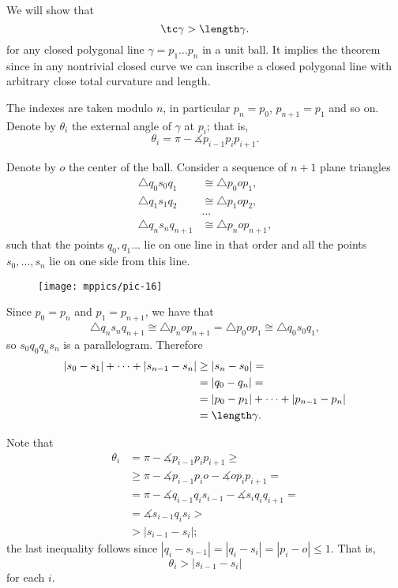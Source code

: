 We will show that 
\[\tc\gamma> \length\gamma.\]
for any closed polygonal line $\gamma=p_1\dots p_{n}$ in a unit ball.
It implies the theorem since in any nontrivial closed curve we can inscribe a closed polygonal line with arbitrary close total curvature and length.

The indexes are taken modulo $n$, in particular $p_{n}=p_0$, $p_{n+1}=p_1$ and so on.
Denote by $\theta_i$ the external angle of $\gamma$ at $p_i$;
that is,
\[\theta_i=\pi-\measuredangle p_{i-1}p_ip_{i+1}.\]

Denote by $o$ the center of the ball.
Consider a sequence of $n+1$ plane triangles
\begin{align*}
\triangle q_0s_0q_1
&\cong 
\triangle p_0op_1,
\\
\triangle q_1s_1q_2
&\cong 
\triangle p_1op_2,
\\
&\dots
\\
\triangle q_{n}s_nq_{n+1}
&\cong 
\triangle p_nop_{n+1},
\end{align*}
such that the points $q_0,q_1\dots$ lie on one line in that order and all the points $s_0,\dots,s_n$ lie on one side from this line.

\begin{figure}[h!]
\vskip-0mm
\centering
\texttt{[image: mppics/pic-16]}
\vskip0mm
\end{figure}

Since $p_0=p_n$ and $p_1=p_{n+1}$, we have that
\[\triangle q_{n}s_nq_{n+1}\cong 
\triangle p_nop_{n+1}=\triangle p_0op_1\cong\triangle q_{0}s_0q_1,\]
so $s_0q_0q_ns_n$ is a parallelogram.
Therefore
\begin{align*}
|s_0-s_1|+\dots+|s_{n-1}-s_n|
&\ge|s_n-s_0|=
\\
&=|q_0-q_n|=
\\
&=|p_0-p_1|+\dots+|p_{n-1}-p_n|
\\
&=\length \gamma.
\end{align*}

Note that 
\begin{align*}
\theta_i&=\pi-\measuredangle p_{i-1}p_ip_{i+1}\ge
\\
&\ge\pi-\measuredangle p_{i-1}p_io-\measuredangle op_ip_{i+1}=
\\
&=\pi-\measuredangle q_{i-1}q_is_{i-1}-\measuredangle s_iq_iq_{i+1}=
\\
&=\measuredangle s_{i-1}q_is_i>
\\
&>|s_{i-1}-s_i|;
\end{align*}
the last inequality follows since $|q_i-s_{i-1}|=|q_i-s_i|=|p_i-o|\le 1$.
That is, 
\[\theta_i>|s_{i-1}-s_i|\]
for each $i$.

